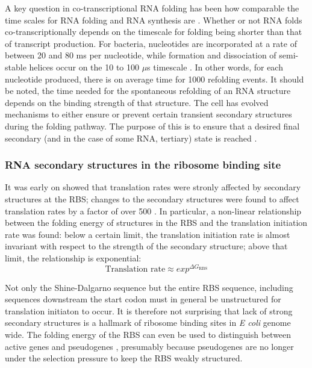 A key question in co-transcriptional RNA folding has been how comparable the
time scales for RNA folding and RNA synthesis are
\cite{de_smit_translational_2003-1}. Whether or not RNA folds
co-transcriptionally depends on the timescale for folding being shorter than
that of transcript production. For bacteria, nucleotides are incorporated at a
rate of between 20 and 80 ms per nucleotide, while formation and dissociation
of semi-stable helices occur on the 10 to 100 $\mu$s timescale
\cite{isambert_jerky_2009}. In other words, for each nucleotide produced, there
is on average time for 1000 refolding events. It should be noted, the time
needed for the spontaneous refolding of an RNA structure depends on the binding
strength of that structure. The cell has evolved mechanisms to either ensure or
prevent certain transient secondary structures during the folding pathway. The
purpose of this is to ensure that a desired final secondary (and in the case of
some RNA, tertiary) state is reached \cite{pan_rna_2006-1}.

\subsubsection{RNA secondary structures in the ribosome binding site}
It was early on showed that translation rates were stronly affected by
secondary structures at the RBS; changes to the secondary structures were found
to affect translation rates by a factor of over 500
\cite{de_smit_secondary_1990}. In particular, a non-linear relationship between
the folding energy of structures in the RBS and the translation initiation
rate was found: below a certain limit, the translation initiation rate is almost
invariant with respect to the strength of the secondary structure; above that
limit, the relationship is exponential:
\begin{equation*}
	\text{Translation rate} \approx exp^{\Delta G_{\text{RBS}}}
\end{equation*}

Not only the Shine-Dalgarno sequence but the entire RBS sequence, including
sequences downstream the start codon \cite{seo_quantitative_2009} must in
general be unstructured for translation initiaton to occur. It is therefore not
surprising that lack of strong secondary structures is a hallmark of ribosome
binding sites in \textit{E coli} \cite{gu_universal_2010} genome wide. The
folding energy of the RBS can even be used to distinguish between active genes
and pseudogenes \cite{keller_reduced_2012}, presumably because pseudogenes are
no longer under the selection pressure to keep the RBS weakly structured.

